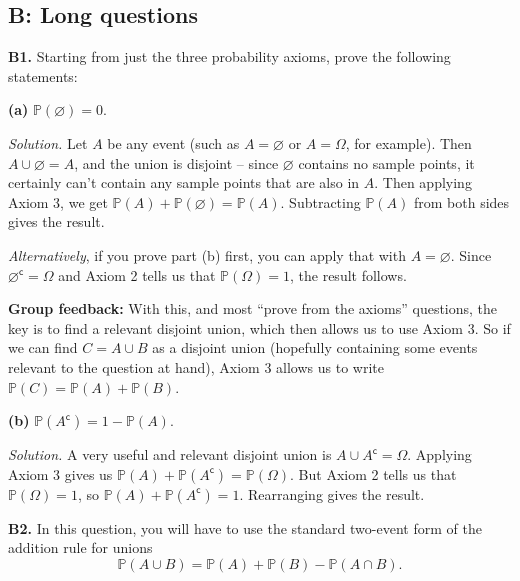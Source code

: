 \documentclass[
  a4paper,
]{book}
\theoremstyle{definition}
\theoremstyle{definition}
\theoremstyle{definition}
\theoremstyle{definition}
\theoremstyle{remark}
\begin{document}
\hypertarget{P2-long-solutions}{%
\subsection*{B: Long questions}\label{P2-long-solutions}}

\textbf{B1.} Starting from just the three probability axioms, prove the following statements:

\textbf{(a)} \(\mathbb P(\varnothing) = 0\).

\begin{myanswers}
\emph{Solution.} Let \(A\) be any event (such as \(A = \varnothing\) or \(A = \Omega\), for example). Then \(A \cup \varnothing = A\), and the union is disjoint -- since \(\varnothing\) contains no sample points, it certainly can't contain any sample points that are also in \(A\). Then applying Axiom 3, we get \(\mathbb P(A) + \mathbb P(\varnothing) = \mathbb P(A)\). Subtracting \(\mathbb P(A)\) from both sides gives the result.

\emph{Alternatively}, if you prove part (b) first, you can apply that with \(A = \varnothing\). Since \(\varnothing^\mathsf{c}= \Omega\) and Axiom 2 tells us that \(\mathbb P(\Omega) = 1\), the result follows.

\textbf{Group feedback:} With this, and most ``prove from the axioms'' questions, the key is to find a relevant disjoint union, which then allows us to use Axiom 3. So if we can find \(C = A \cup B\) as a disjoint union (hopefully containing some events relevant to the question at hand), Axiom 3 allows us to write \(\mathbb P(C) = \mathbb P(A) + \mathbb P(B)\).

\end{myanswers}

\textbf{(b)} \(\mathbb P(A^\mathsf{c}) = 1 - \mathbb P(A)\).

\begin{myanswers}
\emph{Solution.} A very useful and relevant disjoint union is \(A \cup A^\mathsf{c}= \Omega\). Applying Axiom 3 gives us \(\mathbb P(A) + \mathbb P(A^\mathsf{c}) = \mathbb P(\Omega)\). But Axiom 2 tells us that \(\mathbb P(\Omega) = 1\), so \(\mathbb P(A) + \mathbb P(A^\mathsf{c}) = 1\). Rearranging gives the result.

\end{myanswers}

\textbf{B2.} In this question, you will have to use the standard two-event form of the addition rule for unions
\[ \mathbb P(A \cup B) = \mathbb P(A) + \mathbb P(B) - \mathbb P(A \cap B) . \]
\end{document}

